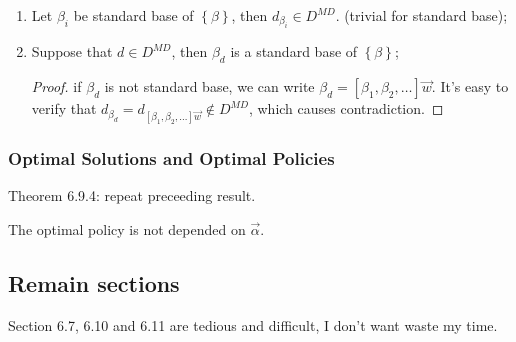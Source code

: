 \begin{enumerate}
    \item Let $ \beta_i $ be standard base of $ \left\{ \beta \right\} $, then $ d_{\beta_i} \in D^{MD} $. (trivial for standard base);
    \item Suppose that $ d \in D^{MD} $, then $ \beta_d $ is a standard base of $ \left\{ \beta \right\} $;
        \begin{proof}
            if $ \beta_d $ is not standard base, we can write $ \beta_d = \left[ \beta_1, \beta_2, \ldots  \right]\vec{w} $. It's easy to verify that $ d_{\beta_d} = d_{\left[ \beta_1, \beta_2, \ldots \right] \vec{w}} \notin D^{MD} $, which causes contradiction.
        \end{proof}
\end{enumerate}

\subsubsection{Optimal Solutions and Optimal Policies}%
\label{ssub:optimal_solutions_and_optimal_policies}

Theorem {6.9.4}: repeat preceeding result.

The optimal policy is not depended on $ \vec{\alpha} $.

\subsection{Remain sections}%
\label{sub:remain_section}
Section {6.7}, {6.10} and {6.11} are tedious and difficult, I don't want waste my time.


